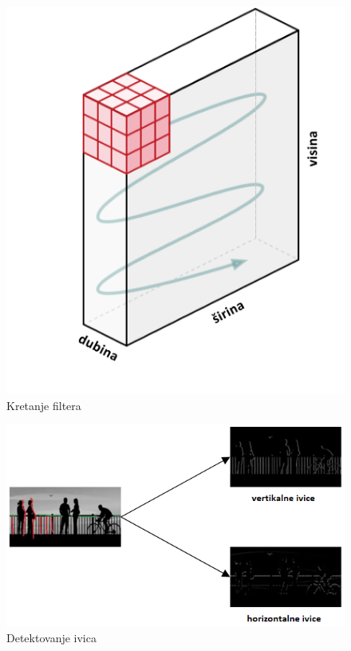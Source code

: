 \documentclass[a4paper]{article}
\begin{document}

\begin{figure}[h!]
\begin{center}
\includegraphics[scale=0.4]{filter_movement01.jpg}
\end{center}
\caption{Kretanje filtera}
\label{fig:filter_movement01}
\end{figure}


\begin{figure}[h!]
\begin{center}
\includegraphics[scale=1]{edges.png}
\end{center}
\caption{Detektovanje ivica}
\label{fig:edges}
\end{figure}
\end{document}
